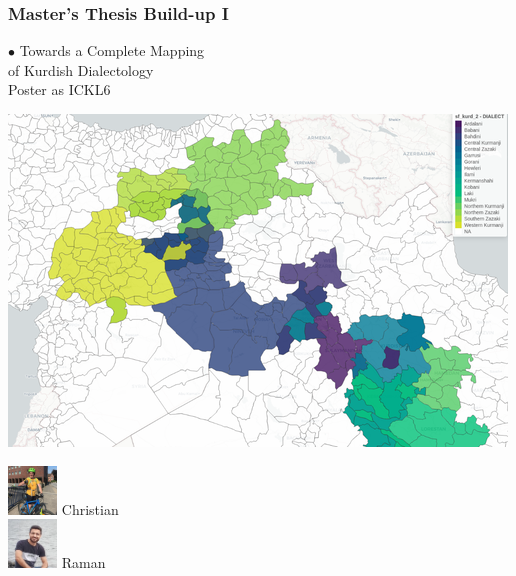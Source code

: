 \documentclass[aspectratio=169]{beamer}
\begin{document}
\begin{frame}[fragile]
	\frametitle{Master's Thesis Build-up I}
    \begin{minipage}{.49\textwidth}
        {\color{thiscolor}$\bullet$} Towards a Complete Mapping \\ of Kurdish Dialectology 
        \\ \citep{schuler2023CompleteMappingKurdish} Poster as ICKL6
        \vspace{5mm}
        \begin{minipage}{.70\textwidth}
            \centering
            \includegraphics[width=\textwidth]{images/ickl6_dialectmapping.png}
        \end{minipage}%
        \begin{minipage}{.30\textwidth}
            \centering
            \includegraphics[height=1.3cm]{images/Christian_Schuler_Bike.JPG}
            Christian
            \vspace{0.5cm}
            \\ \includegraphics[height=1.3cm]{images/Raman_Ahmad.png} 
            Raman
        \end{minipage}

\end{minipage}
\end{frame}
\end{document}
